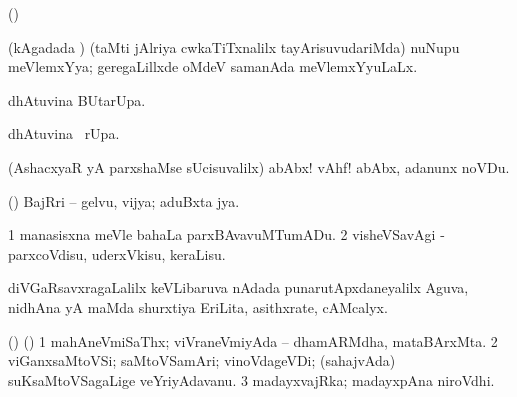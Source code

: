 {{{{{{\begin{center}
{\bentry
{} 
\gl{\kirxvi}
\expl{}
\bmng
(\pArxparx)  
\emng
\eentry

\bentry
{} 
\gl{\gu}
\expl{}
\bmng
(kAgadada \vi) (taMti jAlriya cwkaTiTxnalilx tayArisuvudariMda) nuNupu meVlemxYya; geregaLillxde oMdeV samanAda meVlemxYyuLaLx. 
\emng
\eentry

\bentry
{} 
\gl{\kirx}
\expl{}
\bmng
{} dhAtuvina BUtarUpa. 
\emng
\eentry

\bentry
{} 
\gl{\kirx}
\expl{}
\bmng
{} dhAtuvina \BUkaq\ rUpa. 
\emng
\eentry

\bentry
{} 
\gl{\BAavayx}
\expl{}
\bmng
(AshacxyaR yA parxshaMse sUcisuvalilx) abAbx! vAhf!  abAbx, adanunx noVDu. 
\emng
\eentry

\bentry
{} 
\gl{\nA}
\expl{}
\bmng
(\ashi) BajRri -- gelvu, vijya; aduBxta jya. 
\emng
\eentry

\bentry
{} 
\gl{\sakirx}
\expl{}
\bmng
\bnum
\num{1} manasisxna meVle bahaLa parxBAvavuMTumADu. 
\num{2} visheVSavAgi -parxcoVdisu, uderxVkisu, keraLisu. 
\enum
\emng
\eentry

\bentry
{} 
\gl{\nA}
\expl{}
\bmng
diVGaRsavxragaLalilx keVLibaruva nAdada punarutApxdaneyalilx Aguva, nidhAna yA maMda shurxtiya EriLita, asithxrate, cAMcalyx. 
\emng
\eentry

\bentry
{} 
\gl{\nA}
\expl{}
\bmng
(\AseTxrXV) (\ashi) 
\bnum
\num{1} mahAneVmiSaThx; viVraneVmiyAda -- dhamARMdha, mataBArxMta. 
\num{2} viGanxsaMtoVSi; saMtoVSamAri; vinoVdageVDi; (sahajvAda) suKsaMtoVSagaLige veYriyAdavanu. 
\num{3} madayxvajRka; madayxpAna niroVdhi. 
\enum
\emng
\eentry

\bentry
{} 
\gl{\saMkiSx}
\expl{}
\bmng
{}  
\emng
\eentry

\bentry
{} 
\gl{\saMkiSx}
\expl{}
\bmng
{} 
\emng
\eentry

\bentry
{} 
\gl{\saMkiSx}
\expl{}
\bmng
{} 
\emng
\eentry

\bentry
{} 
\gl{\saMkiSx}
\expl{}
\bmng
{} 
\emng
\eentry

}
\end{center}}}}}}}
